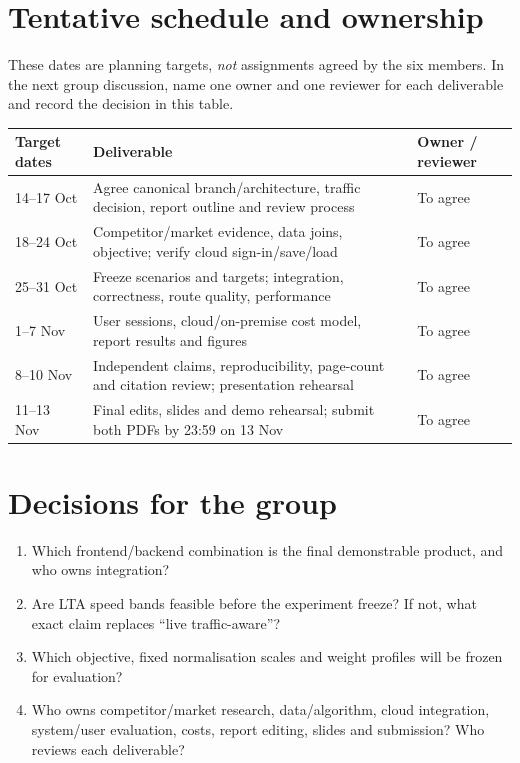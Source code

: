 \documentclass[11pt,a4paper]{article}
\begin{document}
\section{Tentative schedule and ownership}
These dates are planning targets, \emph{not} assignments agreed by the six members. In the next group discussion, name one owner and one reviewer for each deliverable and record the decision in this table.
\begin{center}
\small
\begin{tabular}{p{2.5cm}p{8.1cm}p{2.7cm}}
\toprule
Target dates & Deliverable & Owner / reviewer \\
\midrule
14--17 Oct & Agree canonical branch/architecture, traffic decision, report outline and review process & To agree \\
18--24 Oct & Competitor/market evidence, data joins, objective; verify cloud sign-in/save/load & To agree \\
25--31 Oct & Freeze scenarios and targets; integration, correctness, route quality, performance & To agree \\
1--7 Nov & User sessions, cloud/on-premise cost model, report results and figures & To agree \\
8--10 Nov & Independent claims, reproducibility, page-count and citation review; presentation rehearsal & To agree \\
11--13 Nov & Final edits, slides and demo rehearsal; submit both PDFs by 23:59 on 13 Nov & To agree \\
\bottomrule
\end{tabular}
\end{center}

\section{Decisions for the group}
\begin{enumerate}
  \item Which frontend/backend combination is the final demonstrable product, and who owns integration?
  \item Are LTA speed bands feasible before the experiment freeze? If not, what exact claim replaces ``live traffic-aware''?
  \item Which objective, fixed normalisation scales and weight profiles will be frozen for evaluation?
  \item Who owns competitor/market research, data/algorithm, cloud integration, system/user evaluation, costs, report editing, slides and submission? Who reviews each deliverable?
\end{enumerate}
\end{document}
